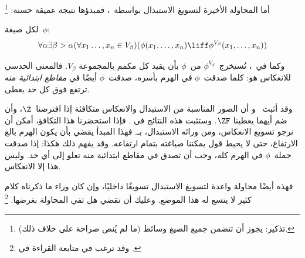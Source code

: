 \documentclass[../../../include/open-logic-section]{subfiles}
\begin{document}

أما المحاولة الأخيرة لتسويغ الاستبدال بواسطة~\stagesinex، فمبدؤها
نتيجة عميقة حسنة:
\footnote{تذكير: يجوز أن تتضمن جميع الصيغ وسائط (ما لم
يُنص صراحة على خلاف ذلك).}
\begin{thm}
لكل صيغة~$\phi$:
\[
\forall \alpha \exists \beta > \alpha (\forall x_1 \ldots, x_n \in
V_\beta)(\phi(x_1, \ldots, x_n) \liff \phi^{V_\beta}(x_1, \ldots, x_n))
\]
\end{thm}
\noindent
وكما في~،
تُستخرج~$\phi^{V_\beta}$ من~$\phi$ بأن يقيد كل مكمم بالمجموعة
$V_\beta$. فالمعنى الحدسي للانعكاس هو: كلما صدقت~$\phi$ في الهرم
بأسره، صدقت~$\phi$ أيضًا في \emph{مقاطع ابتدائية} منه ترتفع فوق
كل حد يعطى.

وقد أثبت~\citet{Montague1961} و\citet{Levy1960} أن الصور المناسبة من
الاستبدال والانعكاس متكافئة إذا افترضنا~$\Z$، وأن ضم أيهما يعطينا
$\ZF$. وستثبت هذه النتائج في
. فإذا استحضرنا هذا التكافؤ،
أمكن أن نرجو تسويغ الانعكاس، ومن ورائه الاستبدال، بـ\stagesinex{}.
فهذا المبدأ يقضي بأن يكون الهرم بالغ الارتفاع، حتى لا يحيط قول يمكننا
صياغته بتمام ارتفاعه. وقد يفهم ذلك هكذا: إذا صدقت جملة~$\phi$ في
الهرم كله، وجب أن تصدق في مقاطع ابتدائية منه تعلو إلى أي حد. وليس هذا
إلا الانعكاس.

فهذه أيضًا محاولة واعدة لتسويغ الاستبدال تسويغًا داخليًا، وإن كان
وراء ما ذكرناه كلام كثير لا يتسع له هذا الموضع. وعليك أن تقضي هل
تفي المحاولة بغرضها.
\footnote{وقد ترغب في متابعة القراءة في
\citet[95--100]{Incurvati2020}.}
\end{document}
